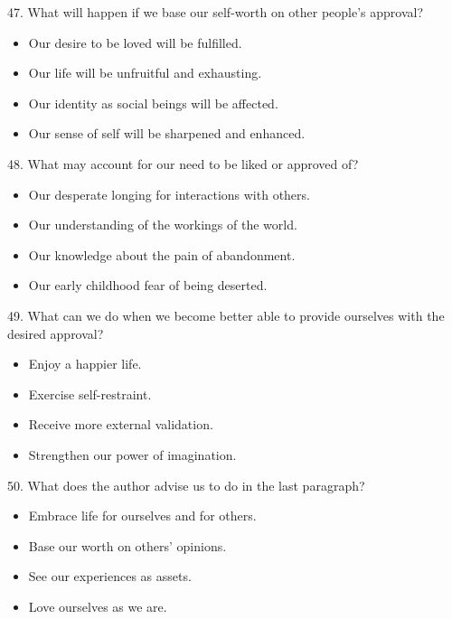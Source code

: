 \documentclass[UTF8,11pt]{ctexart}
\begin{document}
47. What will happen if we base our self-worth on other people’s approval?


\begin{itemize}[leftmargin=2em,itemsep=.2em,topsep=.4em]\item[A.] Our desire to be loved will be fulfilled.
\item[B.] Our life will be unfruitful and exhausting.
\item[C.] Our identity as social beings will be affected.
\item[D.] Our sense of self will be sharpened and enhanced.
\end{itemize}

48. What may account for our need to be liked or approved of?


\begin{itemize}[leftmargin=2em,itemsep=.2em,topsep=.4em]\item[A.] Our desperate longing for interactions with others.
\item[B.] Our understanding of the workings of the world.
\item[C.] Our knowledge about the pain of abandonment.
\item[D.] Our early childhood fear of being deserted.
\end{itemize}

49. What can we do when we become better able to provide ourselves with the desired approval?


\begin{itemize}[leftmargin=2em,itemsep=.2em,topsep=.4em]\item[A.] Enjoy a happier life.
\item[B.] Exercise self-restraint.
\item[C.] Receive more external validation.
\item[D.] Strengthen our power of imagination.
\end{itemize}

50. What does the author advise us to do in the last paragraph?


\begin{itemize}[leftmargin=2em,itemsep=.2em,topsep=.4em]\item[A.] Embrace life for ourselves and for others.
\item[B.] Base our worth on others’ opinions.
\item[C.] See our experiences as assets.
\item[D.] Love ourselves as we are.
\end{itemize}
\end{document}
